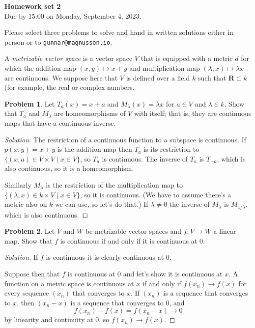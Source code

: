 \documentclass[11pt]{article}
\theoremstyle{definition}
\newtheorem{prob}{Problem}
\newcommand{\kk}[1]{\mathbf{#1}}
\def\head{
\begin{center}
\textbf{\LARGE Homework set 2}
\\[3pt]
Due by 15:00 on Monday, September 4, 2023.
\end{center}
\medskip
}
\begin{document}
\head

Please select three problems to solve and hand in written solutions either in person or to \verb+gunnar@magnusson.io+.

A \emph{metrizable vector space} is a vector space $V$ that is
equipped with a metric $d$ for which the addition map $(x, y) \mapsto x +
y$ and multiplication map $(\lambda, x) \mapsto \lambda x$ are continuous.
We suppose here that $V$ is defined over a field $k$ such that $\kk R \subset k$
(for example, the real or complex numbers.


\begin{prob}
Let $T_a(x) = x + a$ and $M_\lambda(x) = \lambda x$ for $a \in V$ and $\lambda
\in k$.
Show that $T_a$ and $M_\lambda$ are homeomorphisms of $V$ with itself; that is,
they are continuous maps that have a continuous inverse.
\end{prob}


\begin{proof}[Solution]
The restriction of a continuous function to a subspace is continuous.
If $p(x,y) = x+y$ is the addition map then $T_a$ is its restriction to
$\{(x,a) \in V \times V \mid x \in V \}$, so $T_a$ is continuous.
The inverse of $T_a$ is $T_{-a}$, which is also continuous, so it is a
homeomorphism.

Similarly $M_\lambda$ is the restriction of the multiplication map to
$\{(\lambda, x) \in k \times V \mid x \in V \}$, so it is continuous.
(We have to assume there's a metric also on $k$ we can use, so let's do that.)
If $\lambda\not=0$ the inverse of $M_{\lambda}$ is $M_{1/\lambda}$, which is
also continuous.
\end{proof}


\begin{prob}
Let $V$ and $W$ be metrizable vector spaces and $f : V \to W$ a linear map.
Show that $f$ is continuous if and only if it is continuous at $0$.
\end{prob}

\begin{proof}[Solution]
If $f$ is continuous it is clearly continuous at $0$.

Suppose then that $f$ is continuous at $0$ and let's show it is continuous at $x$.
A function on a metric space is continuous at $x$ if and only if $f(x_n) \to f(x)$
for every sequence $(x_n)$ that converges to $x$.
If $(x_n)$ is a sequence that converges to $x$, then $(x_n-x)$ is a sequence
that converges to $0$, and
\[
f(x_n) - f(x)
= f(x_n - x)
\to 0
\]
by linearity and continuity at $0$, so $f(x_n) \to f(x)$.
\end{proof}
\end{document}
